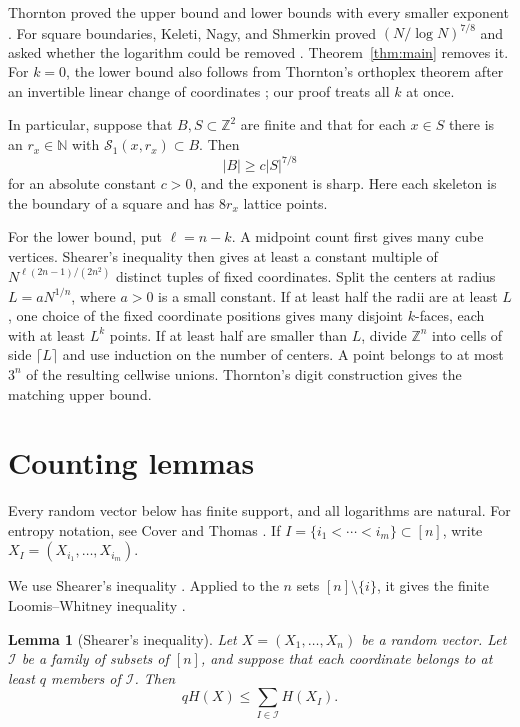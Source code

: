\documentclass[11pt]{amsart}
\numberwithin{equation}{section}
\theoremstyle{plain}
\newtheorem{lemma}[theorem]{Lemma}
\theoremstyle{definition}
\newcommand{\Z}{\mathbb{Z}}
\newcommand{\N}{\mathbb{N}}
\newcommand{\cS}{\mathcal{S}}
\begin{document}
Thornton proved the upper bound and lower bounds with every smaller exponent
\cite[Theorems~1.3 and~1.5]{Thornton2017}.  For square boundaries, Keleti,
Nagy, and Shmerkin proved $(N/\log N)^{7/8}$ and asked whether the logarithm
could be removed \cite[Theorem~1.7]{KeletiNagyShmerkin2018}.
Theorem~\ref{thm:main} removes it.  For $k=0$, the lower bound also follows
from Thornton's orthoplex theorem after an invertible linear change of
coordinates \cite[Theorem~1.9(2)]{Thornton2017}; our proof treats all $k$ at
once.

In particular, suppose that $B,S\subset\Z^2$ are finite and that for each
$x\in S$ there is an $r_x\in\N$ with $\cS_1(x,r_x)\subset B$.  Then
\[
 |B|\geq c|S|^{7/8}
\]
for an absolute constant $c>0$, and the exponent is sharp.  Here each
skeleton is the boundary of a square and has $8r_x$ lattice points.

For the lower bound, put $\ell=n-k$.  A midpoint count first
gives many cube vertices.  Shearer's inequality then gives at least a constant
multiple of $N^{\ell(2n-1)/(2n^2)}$ distinct tuples of fixed coordinates.
Split the centers at radius $L=aN^{1/n}$, where $a>0$ is a small constant.
If at least half the radii are at least $L$, one choice of the fixed coordinate
positions gives many disjoint $k$-faces, each with at least $L^k$ points.  If
at least half are smaller than $L$, divide $\Z^n$ into cells of side
$\lceil L\rceil$ and use induction on the number of centers.  A point belongs
to at most $3^n$ of the resulting cellwise unions.  Thornton's digit
construction gives the matching upper bound.

\section{Counting lemmas}

Every random vector below has finite support, and all logarithms are natural.
For entropy notation, see Cover and Thomas \cite{CoverThomas2006}.  If
$I=\{i_1<\cdots<i_m\}\subset[n]$, write
$X_I=(X_{i_1},\ldots,X_{i_m})$.

We use Shearer's inequality \cite{ChungGrahamFranklShearer1986}.  Applied to
the $n$ sets $[n]\setminus\{i\}$, it gives the finite Loomis--Whitney
inequality \cite{LoomisWhitney1949}.

\begin{lemma}[Shearer's inequality]\label{lem:shearer}
Let $X=(X_1,\ldots,X_n)$ be a random vector.  Let $\mathcal I$ be a family of
subsets of $[n]$, and suppose that each coordinate belongs to at least $q$
members of $\mathcal I$.  Then
\[
 qH(X)\leq\sum_{I\in\mathcal I}H(X_I).
\]
\end{lemma}
\end{document}
